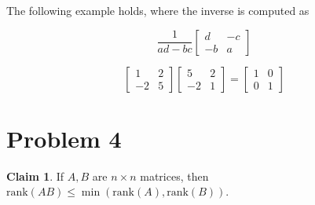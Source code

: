 \documentclass[12pt,letterpaper]{article}
\theoremstyle{definition}
\newtheorem*{claim}{Claim}
\newcommand{\rank}{\mathrm{rank}}
\begin{document}
The following example holds, where the inverse is computed as

\[
  \frac{1}{ad-bc}
  \begin{bmatrix}
    d & -c \\
    -b & a
  \end{bmatrix}
\]
 
\[
  \begin{bmatrix}
    1 & 2 \\
    -2 & 5
  \end{bmatrix}
  \begin{bmatrix}
    5 & 2 \\
    -2 & 1
  \end{bmatrix}
  =
  \begin{bmatrix}
    1 & 0 \\
    0 & 1
  \end{bmatrix}
\]

\section*{Problem 4}

\begin{claim}
  If $A, B$ are $n \times n$ matrices, then $\rank(AB) \leq \min(\rank(A), \rank(B))$.
\end{claim}
\end{document}
